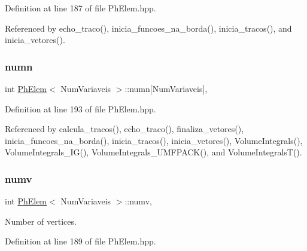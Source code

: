 Definition at line 187 of file Ph\+Elem.\+hpp.



Referenced by echo\+\_\+traco(), inicia\+\_\+funcoes\+\_\+na\+\_\+borda(), inicia\+\_\+tracos(), and inicia\+\_\+vetores().

\mbox{\label{classPhElem_a8e65fa4998d28b9b8db9b6fcf8999d20}} 
\subsubsection{\texorpdfstring{numn}{numn}}
{\footnotesize\ttfamily int \hyperlink{classPhElem}{Ph\+Elem}$<$ Num\+Variaveis $>$\+::numn\mbox{[}Num\+Variaveis\mbox{]}\hspace{0.3cm}{\ttfamily [protected]}, {\ttfamily [inherited]}}



Definition at line 193 of file Ph\+Elem.\+hpp.



Referenced by calcula\+\_\+tracos(), echo\+\_\+traco(), finaliza\+\_\+vetores(), inicia\+\_\+funcoes\+\_\+na\+\_\+borda(), inicia\+\_\+tracos(), inicia\+\_\+vetores(), Volume\+Integrals(), Volume\+Integrals\+\_\+\+I\+G(), Volume\+Integrals\+\_\+\+U\+M\+F\+P\+A\+C\+K(), and Volume\+Integrals\+T().

\mbox{\label{classPhElem_a67ed36925b04bf0f2d177c8d31737526}} 
\subsubsection{\texorpdfstring{numv}{numv}}
{\footnotesize\ttfamily int \hyperlink{classPhElem}{Ph\+Elem}$<$ Num\+Variaveis $>$\+::numv\hspace{0.3cm}{\ttfamily [protected]}, {\ttfamily [inherited]}}



Number of vertices. 



Definition at line 189 of file Ph\+Elem.\+hpp.

\mbox{\label{classPhElem_a141616ccadb4a17328626befc4330932}} 
